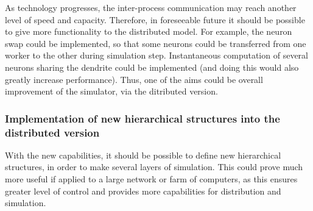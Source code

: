 As technology progresses, the inter-process communication may reach another level of speed and capacity. Therefore, in foreseeable future it should be possible to give more functionality to the distributed model. For example, the neuron swap could be implemented, so that some neurons could be transferred from one worker to the other during simulation step. Instantaneous computation of several neurons sharing the dendrite could be implemented (and doing this would also greatly increase performance). Thus, one of the aims could be overall improvement of the simulator, via the ditributed version.

\subsubsection{Implementation of new hierarchical structures into the distributed version}

With the new capabilities, it should be possible to define new hierarchical structures, in order to make several layers of simulation. This could prove much more useful if applied to a large network or farm of computers, as this ensures greater level of control and provides more capabilities for distribution and simulation.
